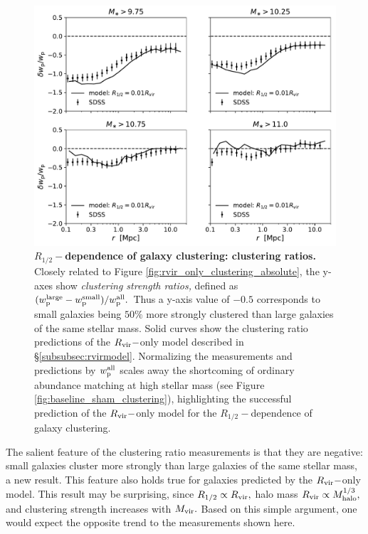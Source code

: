 \documentclass[usenatbib,usegraphicx,letterpaper]{mn2e}
\newcommand{\rhalf}{R_{1/2}}
\newcommand{\mvir}{M_{\rm vir}}
\newcommand{\mhalo}{M_{\rm halo}}
\newcommand{\rvir}{R_{\rm vir}}
\begin{document}
\begin{figure}
\centering
\includegraphics[width=12cm]{FIGS/rvir_only_wp_ratios.pdf}
\caption{
{\bf $\rhalf-$dependence of galaxy clustering: clustering ratios.}
Closely related to Figure \ref{fig:rvir_only_clustering_absolute}, the y-axes show {\em clustering strength ratios,} defined as $(w_{\rm p}^{\rm large} - w_{\rm p}^{\rm small})/w_{\rm p}^{\rm all}.$ Thus a y-axis value of $-0.5$ corresponds to small galaxies being $50\%$ more strongly clustered than large galaxies of the same stellar mass. Solid curves show the clustering ratio predictions of the $\rvir-$only model described in \S\ref{subsubsec:rvirmodel}. Normalizing the measurements and predictions by $w_{\rm p}^{\rm all}$ scales away the shortcoming of ordinary abundance matching at high stellar mass (see Figure \ref{fig:baseline_sham_clustering}), highlighting the successful prediction of the $\rvir-$only model for the $\rhalf-$dependence of galaxy clustering. 
}
\label{fig:clustering_ratio_upshot}
\end{figure}

The salient feature of the clustering ratio measurements is that they are negative: small galaxies cluster more strongly than large galaxies of the same stellar mass, a new result. This feature also holds true for galaxies predicted by the $\rvir-$only model. This result may be surprising, since $\rhalf\propto\rvir,$ halo mass $\rvir\propto\mhalo^{1/3},$ and clustering strength increases with $\mvir.$ Based on this simple argument, one would expect the opposite trend to the measurements shown here.
\end{document}
